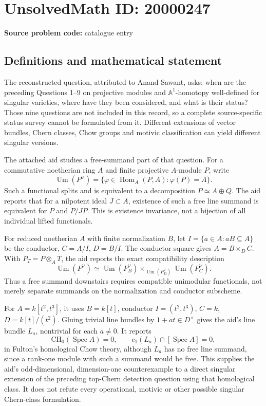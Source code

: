 \documentclass[11pt]{article}
\newcommand{\A}{\mathbb{A}}
\begin{document}
\section*{UnsolvedMath ID: 20000247}
\textbf{Source problem code:} catalogue entry
\subsection{Definitions and mathematical statement}
The reconstructed question, attributed to Anand Sawant, asks: when are the preceding Questions 1--9 on projective modules and \(\A^1\)-homotopy well-defined for singular varieties, where have they been considered, and what is their status? Those nine questions are not included in this record, so a complete source-specific status survey cannot be formulated from it. Different extensions of vector bundles, Chern classes, Chow groups and motivic classification can yield different singular versions.

The attached aid studies a free-summand part of that question. For a commutative noetherian ring \(A\) and finite projective \(A\)-module \(P\), write
\[
\operatorname{Um}(P^\vee)=\{\varphi\in\operatorname{Hom}_A(P,A):\varphi(P)=A\}.
\]
Such a functional splits and is equivalent to a decomposition \(P\simeq A\oplus Q\). The aid reports that for a nilpotent ideal \(J\subset A\), existence of such a free line summand is equivalent for \(P\) and \(P/JP\). This is existence invariance, not a bijection of all individual lifted functionals.

For reduced noetherian \(A\) with finite normalization \(B\), let \(I=\{a\in A:aB\subseteq A\}\) be the conductor, \(C=A/I\), \(D=B/I\). The conductor square gives \(A=B\times_D C\). With \(P_T=P\otimes_A T\), the aid reports the exact compatibility description
\[
\operatorname{Um}(P^\vee)\simeq
\operatorname{Um}(P_B^\vee)
\mathbin{\times}_{\operatorname{Um}(P_D^\vee)}
\operatorname{Um}(P_C^\vee).
\]
Thus a free summand downstairs requires compatible unimodular functionals, not merely separate summands on the normalization and conductor subscheme.

For \(A=k[t^2,t^3]\), it uses \(B=k[t]\), conductor \(I=(t^2,t^3)\), \(C=k\), \(D=k[t]/(t^2)\). Gluing trivial line bundles by \(1+at\in D^\times\) gives the aid's line bundle \(L_a\), nontrivial for each \(a\ne0\). It reports
\[
\mathrm{CH}_0(\operatorname{Spec}A)=0,
\qquad c_1(L_a)\cap[\operatorname{Spec}A]=0,
\]
in Fulton's homological Chow theory, although \(L_a\) has no free line summand, since a rank-one module with such a summand would be free. This supplies the aid's odd-dimensional, dimension-one counterexample to a direct singular extension of the preceding top-Chern detection question using that homological class. It does not refute every operational, motivic or other possible singular Chern-class formulation.
\end{document}
